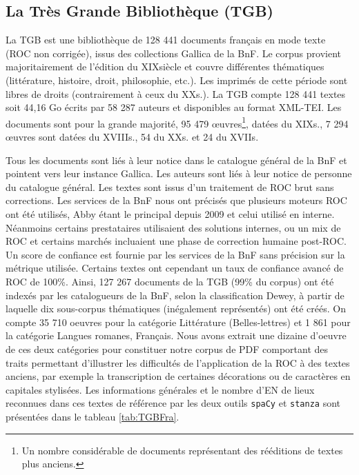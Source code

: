 
\subsection{La Très Grande Bibliothèque (TGB)}
 La TGB est une bibliothèque de 128 441 documents français en mode texte (ROC non corrigée), issus des collections Gallica de la BnF. Le corpus provient majoritairement de l’édition du XIX\ieme{}siècle et couvre différentes thématiques (littérature, histoire, droit, philosophie, etc.). Les imprimés de cette période sont libres de droits (contrairement à ceux du XX\ieme{}s.). La TGB compte 128 441 textes soit 44,16 Go écrits par 58 287 auteurs et disponibles au format XML-TEI. Les documents sont pour la grande majorité, 95 479 œuvres\footnote{Un nombre considérable de documents représentant des rééditions de textes plus anciens.}, datées du XIX\ieme{}s., 7 294 œuvres sont datées du XVIII\ieme{}s., 54 du XX\ieme{}s. et 24 du XVII\ieme{}s.

Tous les documents sont liés à leur notice dans le catalogue général de la BnF et pointent vers leur instance Gallica. Les auteurs sont liés à leur notice de personne du catalogue général. Les textes sont issus d’un traitement de ROC brut sans corrections. Les services de la BnF nous ont précisés que plusieurs moteurs ROC ont été utilisés, Abby étant le principal depuis 2009 et celui utilisé en interne. Néanmoins certains prestataires utilisaient des solutions internes, ou un mix de ROC et certains marchés incluaient une phase de correction humaine post-ROC.
Un score de confiance est fournie par les services de la BnF sans précision sur la métrique utilisée. Certains textes ont cependant un taux de confiance avancé de ROC de 100\%. Ainsi, 127 267 documents de la TGB (99\% du corpus) ont été indexés par les catalogueurs de la BnF, selon la classification Dewey, à partir de laquelle dix sous-corpus thématiques (inégalement représentés) ont été créés. %
On compte 35 710 oeuvres pour la catégorie Littérature (Belles-lettres) et 1 861 pour la catégorie Langues romanes, Français. Nous avons extrait une dizaine d'oeuvre de ces deux catégories pour constituer notre corpus de PDF comportant des traits permettant d'illustrer les difficultés de l'application de la ROC à des textes anciens, par exemple la transcription de certaines décorations ou de caractères en capitales stylisées. Les informations générales et le nombre d'EN de lieux reconnues dans ces textes de référence par les deux outils \texttt{spaCy} et \texttt{stanza} sont présentées dans le tableau \ref{tab:TGBFra}. 

